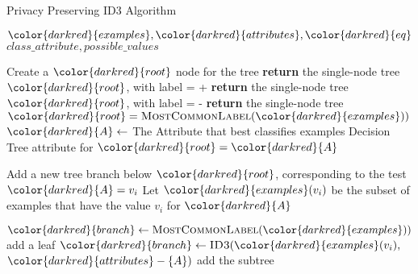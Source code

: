 \begin{algorithm}[H]
\caption{Privacy Preserving ID3 Algorithm}\label{a:id3-pp}
\begin{algorithmic}[1]
\renewcommand{\algorithmicrequire}{\textbf{Private Vars:}}
\Require ${\color{darkred}{examples}}, {\color{darkred}{attributes}}, {\color{darkred}{eq}}$
\renewcommand{\algorithmicrequire}{\textbf{Global Vars:}}
\Require $class\_attribute, possible\_values$

    \State Create a ${\color{darkred}{root}}$ node for the tree
        \State \textbf{return} the single-node tree ${\color{darkred}{root}}$, with label = +
        \State \textbf{return} the single-node tree ${\color{darkred}{root}}$, with label = -
        \State \textbf{return} the single-node tree ${\color{darkred}{root}} = \textsc{MostCommonLabel}({\color{darkred}{examples}}))$
    \Else
        \State ${\color{darkred}{A}} \gets$ The Attribute that best classifies examples
        \State Decision Tree attribute for ${\color{darkred}{root}} = {\color{darkred}{A}}$
    
            \State Add a new tree branch below ${\color{darkred}{root}}$, corresponding to the test ${\color{darkred}{A}} = v_i$
            \State Let ${\color{darkred}{examples}}(v_i)$ be the subset of examples that have the value $v_i$ for ${\color{darkred}{A}}$
            
                \State ${\color{darkred}{branch}} \gets \textsc{MostCommonLabel}({\color{darkred}{examples}}))$ add a leaf
            \Else
                \State ${\color{darkred}{branch}} \gets \textsc{ID3}({\color{darkred}{examples}}(v_i),$ ${\color{darkred}{attributes}} - \{A\})$ add the subtree
            \EndIf
        \EndFor
    \EndIf
\EndProcedure

\end{algorithmic}
\end{algorithm}

